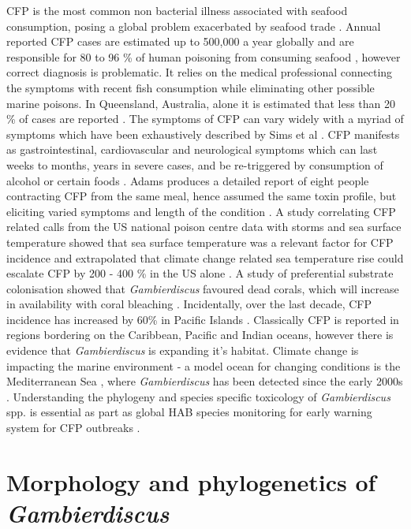 \documentclass[12pt]{article}
\begin{document}
CFP is the most common non bacterial illness associated with seafood consumption, posing a global problem exacerbated by seafood trade \cite{friedman2008ciguatera}. %
Annual reported CFP cases are estimated up to 500,000 a year globally and are responsible for 80 to 96 \% of human poisoning from consuming seafood \cite{fleming1998seafood,grandjean2008centers}, however correct diagnosis is problematic. It relies on the medical professional connecting the symptoms with recent fish consumption while eliminating other possible marine poisons. In Queensland, Australia, alone it is estimated that less than 20 \% of cases are reported \cite{lewis2006ciguatera}.
The symptoms of CFP can vary widely with a myriad of symptoms which have been exhaustively described by Sims et al \cite{sims1987theoretical}. CFP manifests as gastrointestinal, cardiovascular and neurological symptoms which can last weeks to months, years in severe cases, and be re-triggered by consumption of alcohol or certain foods \cite{lewis2006ciguatera}. Adams produces a detailed report of eight people contracting CFP from the same meal, hence assumed the same toxin profile, but eliciting varied symptoms and length of the condition \cite{adams1993outbreak}. 
A study correlating CFP related calls from the US national poison centre data with storms and sea surface temperature showed that sea surface temperature was a relevant factor for CFP incidence and extrapolated that climate change related sea temperature rise could escalate CFP by 200 - 400 \% in the US alone \cite{garces2012habitat}. A study of preferential substrate colonisation showed that \emph{Gambierdiscus} favoured dead corals, which will increase in availability with coral bleaching \cite{grzebyk1994ecology}. Incidentally, over the last decade, CFP incidence has increased by 60\% in Pacific Islands \cite{skinner2011ciguatera}.
Classically CFP is reported in regions bordering on the Caribbean, Pacific and Indian oceans, however there is evidence that \emph{Gambierdiscus} is expanding it's habitat. Climate change is impacting the marine environment - a model ocean for changing conditions is the Mediterranean Sea \cite{lejeusne2010climate}, where \emph{Gambierdiscus} has been detected since the early 2000s \cite{aligizaki2008morphological}.
Understanding the phylogeny and species specific toxicology of \emph{Gambierdiscus} spp. is essential as part as global HAB species monitoring for early warning system for CFP outbreaks \cite{berdalet2012global}.


\section{Morphology and phylogenetics of \emph{Gambierdiscus}}
\end{document}
